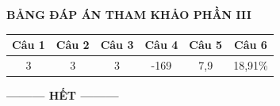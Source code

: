 \documentclass[12pt,a4paper]{article}
\begin{document}
\bigskip
\noindent\textbf{\large BẢNG ĐÁP ÁN THAM KHẢO PHẦN III}
\vspace{0.2cm}

\noindent
\begin{center}
\begin{tabular}{|c|c|c|c|c|c|}
\hline
\textbf{Câu 1} & \textbf{Câu 2} & \textbf{Câu 3} & \textbf{Câu 4} & \textbf{Câu 5} & \textbf{Câu 6} \\
\hline
3 & 3 & 3 & -169 & 7,9 & 18,91\% \\
\hline
\end{tabular}
\end{center}

\begin{center}
\textbf{--------- HẾT ---------}
\end{center}
\end{document}
